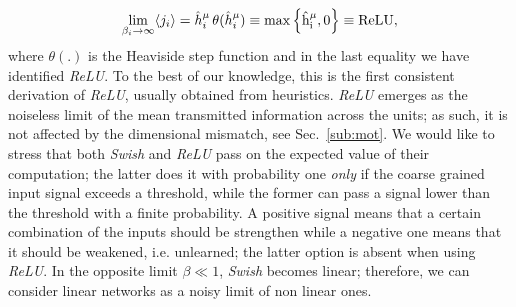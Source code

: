 \documentclass{article}
\begin{document}
%
\begin{equation} \label{eq:ps6}
\lim_{\beta_i \to \infty } \langle j_i \rangle =  \hat{h}^{\mu}_i \, \theta(\hat{h}^{\mu}_i)  \equiv   \rm{max} \left\{ \hat{h}^{\mu}_i, 0\right\} \equiv ReLU,
\end{equation}
%
where $\theta(.)$ is the Heaviside step function and in the last equality we have identified {\it ReLU}. To the best of our knowledge, this is the first consistent derivation of {\it ReLU}, usually obtained from heuristics. {\it ReLU} emerges as the noiseless limit of the mean transmitted information across the units; as such, it is not affected by the dimensional mismatch, see Sec.~\eqref{sub:mot}. We would like to stress that both {\it Swish} and {\it ReLU} pass on the expected value of their computation; the latter does it with probability one {\it only} if the coarse grained input signal exceeds a threshold, while the former can pass a signal lower than the threshold with a finite probability. A positive signal means that a certain combination of the inputs should be strengthen while a negative one means that it should be weakened, i.e. unlearned; the latter option is absent when using {\it ReLU}. In the opposite limit $\beta \ll 1$, {\it Swish} becomes linear; therefore, we can consider linear networks as a noisy limit of non linear ones.
%
%
\end{document}
